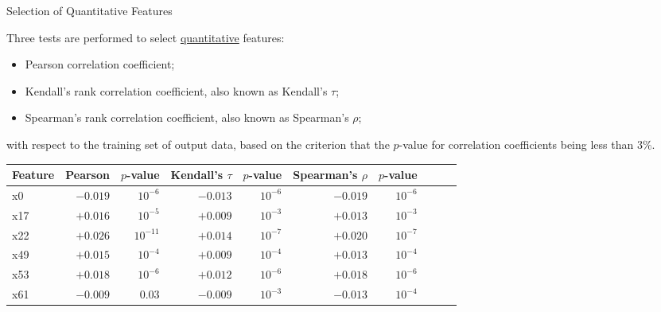 \documentclass{beamer}
\begin{document}
\begin{frame}{Selection of Quantitative Features}


Three tests are performed to select \underline{quantitative} features:
\begin{itemize}[noitemsep]
\item Pearson correlation coefficient;
\item Kendall's rank correlation coefficient, also known as Kendall's $\tau$;
\item Spearman's rank correlation coefficient, also known as Spearman's $\rho$;
\end{itemize}
with respect to the training set of output data, based on the criterion that the $p$-value for correlation coefficients being less than $3\%$. \\
\quad
	\small
	\begin{tabular}{lrrrrrrrrr}  
		\toprule
		Feature & Pearson & $p$-value & Kendall's $\tau$ & $p$-value & Spearman's $\rho$ & $p$-value  \\
		\midrule		
		x0 & 	$-0.019$ & $10^{-6}$	&	$-0.013$ & $10^{-6}$	& $-0.019$	&	$10^{-6}$ \\
		x17 & $+0.016$	& $10^{-5}$	&	$+0.009$ & $10^{-3}$	& $+0.013$	&	$10^{-3}$ \\
		x22 & $+0.026$	& $10^{-11}$	&	$+0.014$ & $10^{-7}$	&	$+0.020$ &	$10^{-7}$ \\
		x49 & $+0.015$	& $10^{-4}$	&	$+0.009$ & $10^{-4}$	& $+0.013$	&	$10^{-4}$ \\
		x53 & $+0.018$	& $10^{-6}$	&	$+0.012$ & $10^{-6}$	& $+0.018$	&	$10^{-6}$ \\
		x61 & $-0.009$	& $0.03$	&	$-0.009$ & $10^{-3}$	& $-0.013$	&	$10^{-4}$ \\
		\bottomrule
	\end{tabular}


\end{frame}
\end{document}
